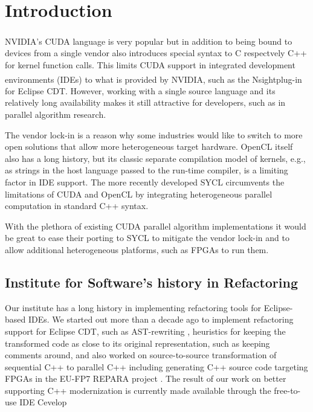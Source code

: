 \documentclass[sigconf]{acmart}
\newcommand{\nvidia}{NVIDIA\textsuperscript{\textregistered}}
\newcommand{\nsight}{Nsight\texttrademark{}}
\begin{document}
%
\maketitle

\section{Introduction}

\nvidia's CUDA language is very popular but in addition to being bound to devices from a single vendor also introduces special syntax to C respectvely C++ for kernel function calls. This limits CUDA support in integrated development environments (IDEs) to what is provided by \nvidia, such as the \nsight plug-in for Eclipse CDT. However, working with a single source language and its relatively long availability makes it still attractive for developers, such as in parallel algorithm research.

The vendor lock-in is a reason why some industries would like to switch to more open solutions that allow more heterogeneous target hardware. OpenCL itself also has a long history, but its classic separate compilation model of kernels, e.g., as strings in the host language passed to the run-time compiler, is a limiting factor in IDE support. The more recently developed SYCL circumvents the limitations of CUDA and OpenCL by integrating heterogeneous parallel computation in standard C++ syntax.

With the plethora of existing CUDA parallel algorithm implementations it would be great to ease their porting to SYCL to mitigate the vendor lock-in and to allow additional heterogeneous platforms, such as FPGAs to run them.

\subsection{Institute for Software's history in Refactoring}
Our institute has a long history in implementing refactoring tools for Eclipse-based IDEs. We started out more than a decade ago to implement refactoring support for Eclipse CDT, such as AST-rewriting \cite{Graf2007}, heuristics for keeping the transformed code as close to its original representation, such as keeping comments around\cite{Sommerlad2008}, and also worked on source-to-source transformation of sequential C++ to parallel C++ including generating C++ source code targeting FPGAs in the EU-FP7 REPARA project
\cite{repara2016} \cite{repara2016a}. The result of our work on better supporting C++ modernization is currently made available through the free-to-use IDE Cevelop\cite{cevelop}
\end{document}
